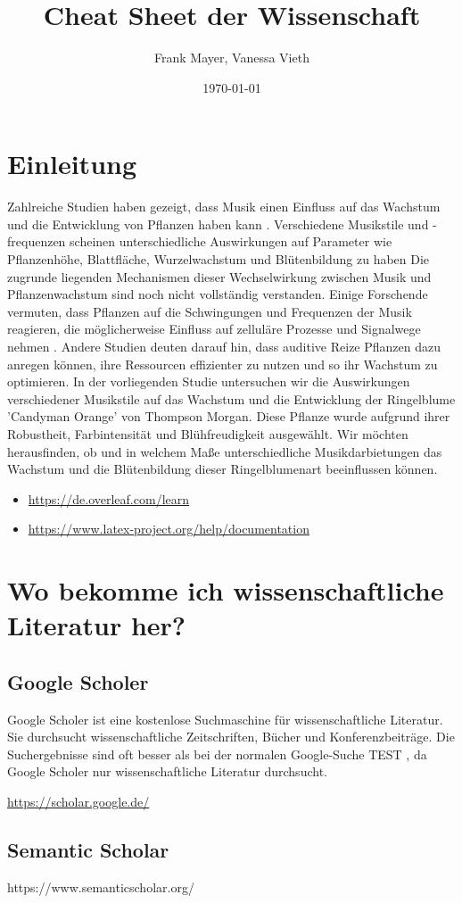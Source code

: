 \documentclass[11pt]{article}
\begin{document}
	\title{Cheat Sheet der Wissenschaft}
	\author{Frank Mayer, Vanessa Vieth}
	\date{\today}
	\maketitle
	\tableofcontents

	\pagebreak

\section{Einleitung}
Zahlreiche Studien haben gezeigt, dass Musik einen Einfluss auf das Wachstum und die Entwicklung von Pflanzen haben kann . Verschiedene Musikstile und -frequenzen scheinen unterschiedliche Auswirkungen auf Parameter wie Pflanzenhöhe, Blattfläche, Wurzelwachstum und Blütenbildung zu haben
Die zugrunde liegenden Mechanismen dieser Wechselwirkung zwischen Musik und Pflanzenwachstum sind noch nicht vollständig verstanden. Einige Forschende vermuten, dass Pflanzen auf die Schwingungen und Frequenzen der Musik reagieren, die möglicherweise Einfluss auf zelluläre Prozesse und Signalwege nehmen . Andere Studien deuten darauf hin, dass auditive Reize Pflanzen dazu anregen können, ihre Ressourcen effizienter zu nutzen und so ihr Wachstum zu optimieren. In der vorliegenden Studie untersuchen wir die Auswirkungen verschiedener Musikstile auf das Wachstum und die Entwicklung der Ringelblume 'Candyman Orange' von Thompson 
Morgan. 
Diese Pflanze wurde aufgrund ihrer Robustheit, Farbintensität und Blühfreudigkeit ausgewählt. Wir möchten herausfinden, ob und in welchem Maße unterschiedliche Musikdarbietungen das Wachstum und die Blütenbildung dieser Ringelblumenart beeinflussen können.
	\begin{itemize}
		\item \href{https://de.overleaf.com/learn}{https://de.overleaf.com/learn}
		\item \href{https://www.latex-project.org/help/documentation/}{https://www.latex-project.org/help/documentation}
	\end{itemize}

	\section{Wo bekomme ich wissenschaftliche Literatur her?}
	\subsection{Google Scholer}
	Google Scholer ist eine kostenlose Suchmaschine für wissenschaftliche Literatur. Sie durchsucht wissenschaftliche Zeitschriften, Bücher und Konferenzbeiträge. Die Suchergebnisse sind oft besser als bei der normalen Google-Suche
	TEST
	, da Google Scholer nur wissenschaftliche Literatur durchsucht. \cite{halevi2017suitability}

	\href{htts://scholar.google.de/}{https://scholar.google.de/}

	\subsection{Semantic Scholar}
	https://www.semanticscholar.org/

	\pagebreak

	{}
	
\end{document}
